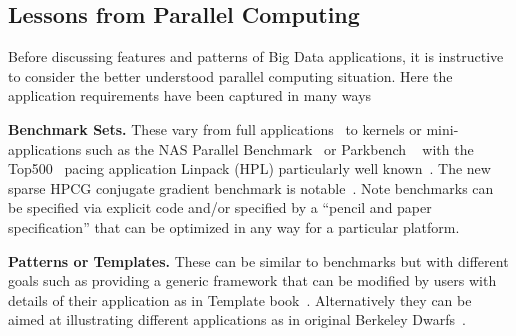 \documentclass{acm_proc_article-sp}
\begin{document}
\subsection{Lessons from Parallel Computing}
Before discussing features and patterns of Big Data applications, it
is instructive to consider the better understood parallel computing
situation. Here the application requirements have been captured in
many ways

\begin{compactenum}
\item \textbf{Benchmark Sets.} These vary from full applications~\cite{b9} to
kernels or mini-applications such as the NAS Parallel Benchmark~\cite{b20,b25}
or Parkbench ~\cite{b5} with the Top500~\cite{b16} pacing application Linpack
(HPL) particularly well known~\cite{b6}. The new sparse HPCG conjugate gradient
benchmark is notable~\cite{b6}. Note benchmarks can be specified via explicit
code and/or specified by a ``pencil and paper specification'' that can be
optimized in any way for a particular platform. 
\item \textbf{Patterns or Templates.} These can be similar to benchmarks but
with different goals such as providing a generic framework that can be modified
by users with details of their application as in Template book~\cite{b24,b29}.
Alternatively they can be aimed at illustrating different applications as in
original Berkeley Dwarfs~\cite{b8}.
\end{compactenum}
\end{document}
